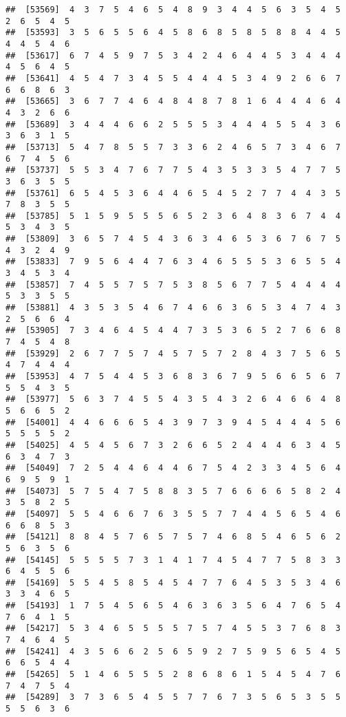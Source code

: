 \documentclass[
]{book}
\begin{document}
\begin{verbatim}
##  [53569]  4  3  7  5  4  6  5  4  8  9  3  4  4  5  6  3  5  4  5  2  6  5  4  5
##  [53593]  3  5  6  5  5  6  4  5  8  6  8  5  8  5  8  8  4  4  5  4  4  5  4  6
##  [53617]  6  7  4  5  9  7  5  3  4  2  4  6  4  4  5  3  4  4  4  4  5  6  4  5
##  [53641]  4  5  4  7  3  4  5  5  4  4  4  5  3  4  9  2  6  6  7  6  6  8  6  3
##  [53665]  3  6  7  7  4  6  4  8  4  8  7  8  1  6  4  4  4  6  4  4  3  2  6  6
##  [53689]  3  4  4  4  6  6  2  5  5  5  3  4  4  4  5  5  4  3  6  3  6  3  1  5
##  [53713]  5  4  7  8  5  5  7  3  3  6  2  4  6  5  7  3  4  6  7  6  7  4  5  6
##  [53737]  5  5  3  4  7  6  7  7  5  4  3  5  3  3  5  4  7  7  5  3  6  3  5  5
##  [53761]  6  5  4  5  3  6  4  4  6  5  4  5  2  7  7  4  4  3  5  7  8  3  5  5
##  [53785]  5  1  5  9  5  5  5  6  5  2  3  6  4  8  3  6  7  4  4  5  3  4  3  5
##  [53809]  3  6  5  7  4  5  4  3  6  3  4  6  5  3  6  7  6  7  5  4  3  2  4  9
##  [53833]  7  9  5  6  4  4  7  6  3  4  6  5  5  5  3  6  5  5  4  3  4  5  3  4
##  [53857]  7  4  5  5  7  5  7  5  3  8  5  6  7  7  5  4  4  4  4  5  3  3  5  5
##  [53881]  4  3  5  3  5  4  6  7  4  6  6  3  6  5  3  4  7  4  3  2  5  6  6  4
##  [53905]  7  3  4  6  4  5  4  4  7  3  5  3  6  5  2  7  6  6  8  7  4  5  4  8
##  [53929]  2  6  7  7  5  7  4  5  7  5  7  2  8  4  3  7  5  6  5  4  7  4  4  4
##  [53953]  4  7  5  4  4  5  3  6  8  3  6  7  9  5  6  6  5  6  7  5  5  4  3  5
##  [53977]  5  6  3  7  4  5  5  4  3  5  4  3  2  6  4  6  6  4  8  5  6  6  5  2
##  [54001]  4  4  6  6  6  5  4  3  9  7  3  9  4  5  4  4  4  5  6  5  5  5  5  2
##  [54025]  4  5  4  5  6  7  3  2  6  6  5  2  4  4  4  6  3  4  5  6  3  4  7  3
##  [54049]  7  2  5  4  4  6  4  4  6  7  5  4  2  3  3  4  5  6  4  6  9  5  9  1
##  [54073]  5  7  5  4  7  5  8  8  3  5  7  6  6  6  6  5  8  2  4  3  5  8  2  5
##  [54097]  5  5  4  6  6  7  6  3  5  5  7  7  4  4  5  6  5  4  6  6  6  8  5  3
##  [54121]  8  8  4  5  7  6  5  7  5  7  4  6  8  5  4  6  5  6  2  5  6  3  5  6
##  [54145]  5  5  5  5  7  3  1  4  1  7  4  5  4  7  7  5  8  3  3  6  4  5  5  6
##  [54169]  5  5  4  5  8  5  4  5  4  7  7  6  4  5  3  5  3  4  6  3  3  4  6  5
##  [54193]  1  7  5  4  5  6  5  4  6  3  6  3  5  6  4  7  6  5  4  7  6  4  1  5
##  [54217]  5  3  4  6  5  5  5  5  7  5  7  4  5  5  3  7  6  8  3  7  4  6  4  5
##  [54241]  4  3  5  6  6  2  5  6  5  9  2  7  5  9  5  6  5  4  5  6  6  5  4  4
##  [54265]  5  1  4  6  5  5  5  2  8  6  8  6  1  5  4  5  4  7  6  7  4  7  5  4
##  [54289]  3  7  3  6  5  4  5  5  7  7  6  7  3  5  6  5  3  5  5  5  5  6  3  6

\end{verbatim}
\end{document}
